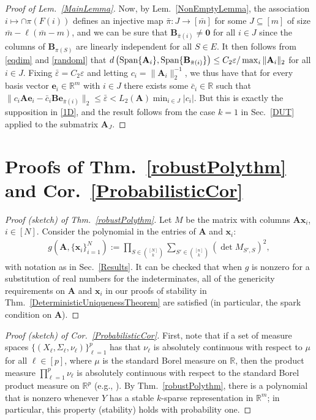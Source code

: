 \documentclass[9pt,twocolumn]{pnas-new}
\begin{document}
\begin{proof}[Proof of Lem.~\ref{MainLemma}]
Now, by Lem.~\ref{NonEmptyLemma}, the association $i \mapsto \cap \pi(F(i))$ defines an injective map $\bar \pi: J \to [\bar m]$ for some $J \subseteq [m]$ of size $\bar m - \ell(\bar m - m)$, and we can be sure that $\mathbf{B}_{\bar \pi(i)} \neq \mathbf{0}$ for all $i \in J$ since the columns of $\mathbf{B}_{\pi(S)}$ are linearly independent for all $S \in E$. It then follows from \eqref{eqdim} and \eqref{randoml} that $d\left( \text{\rm Span}\{\mathbf{A}_i\}, \text{\rm Span}\{ \mathbf{B}_{\bar \pi(i)} \} \right) \leq C_2 \varepsilon / \max_i \|\mathbf{A}_i\|_2$ for all $i \in J$. Fixing $\bar \varepsilon = C_2\varepsilon$ and letting $c_i = \|\mathbf{A}_i\|_2^{-1}$, we thus have that for every basis vector $\mathbf{e}_i \in \mathbb{R}^m$ with $i \in J$ there exists some $\bar{c}_i \in \mathbb{R}$ such that $\|c_i\mathbf{A}\mathbf{e}_i - \bar{c}_i \mathbf{B}\mathbf{e}_{\bar \pi(i)}\|_2 \leq \bar \varepsilon < L_2(\mathbf{A}) \min_{i\in J} |c_i|$.  But this is exactly the supposition in \eqref{1D}, and the result follows from the case $k=1$ in Sec.~\ref{DUT} applied to the submatrix $\mathbf{A}_J$.
\end{proof}

\section{Proofs of Thm.~\ref{robustPolythm} and Cor.~\ref{ProbabilisticCor}}

\begin{proof}[Proof (sketch) of Thm.~\ref{robustPolythm}]
Let $M$ be the matrix with columns $\mathbf{A}\mathbf{x}_i$, $i \in [N]$.  Consider the polynomial in the entries of $\mathbf{A}$ and $\mathbf{x}_i$:
\begin{align*}
g(\mathbf{A}, \{\mathbf{x}_i\}_{i=1}^N) := \prod_{S \in {[N] \choose k}} \sum_{S' \in {[n] \choose k}} (\det M_{S',S})^2,
\end{align*}
with notation as in Sec.~\ref{Results}.  
It can be checked that when $g$ is nonzero for a substitution of real numbers for the indeterminates, all of the genericity requirements on $\mathbf{A}$ and $\mathbf{x}_i$ in our proofs of stability in Thm.~\ref{DeterministicUniquenessTheorem} are satisfied (in particular, the spark condition on $\mathbf{A}$).
\end{proof}

\begin{proof}[Proof (sketch) of Cor.~\ref{ProbabilisticCor}]
First, note that if a set of measure spaces $\{(X_{\ell}, \Sigma_{\ell}, \nu_{\ell})\}_{\ell=1}^p$ has that $\nu_{\ell}$ is absolutely continuous with respect to $\mu$ for all $\ell \in [p]$, where $\mu$ is the standard Borel measure on $\mathbb{R}$, then the product measure $\prod_{\ell=1}^p \nu_{\ell}$ is absolutely continuous with respect to the standard Borel product measure on $\mathbb{R}^p$ (e.g.,  \cite{folland2013real}). By Thm.~\ref{robustPolythm}, there is a polynomial that is nonzero whenever $Y$ has a stable $k$-sparse representation in $\mathbb{R}^m$; in particular, this property (stability) holds with probability one.
\end{proof}
\end{document}
